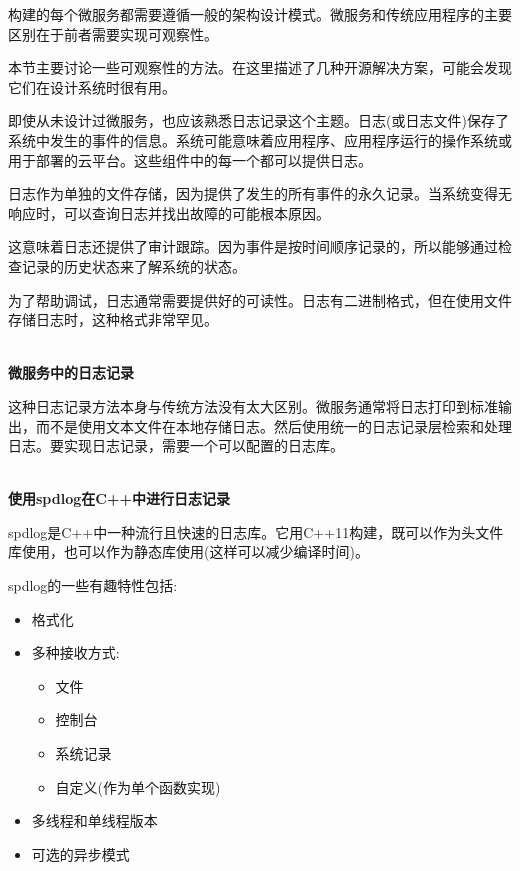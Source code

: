 
构建的每个微服务都需要遵循一般的架构设计模式。微服务和传统应用程序的主要区别在于前者需要实现可观察性。

本节主要讨论一些可观察性的方法。在这里描述了几种开源解决方案，可能会发现它们在设计系统时很有用。


即使从未设计过微服务，也应该熟悉日志记录这个主题。日志(或日志文件)保存了系统中发生的事件的信息。系统可能意味着应用程序、应用程序运行的操作系统或用于部署的云平台。这些组件中的每一个都可以提供日志。

日志作为单独的文件存储，因为提供了发生的所有事件的永久记录。当系统变得无响应时，可以查询日志并找出故障的可能根本原因。

这意味着日志还提供了审计跟踪。因为事件是按时间顺序记录的，所以能够通过检查记录的历史状态来了解系统的状态。

为了帮助调试，日志通常需要提供好的可读性。日志有二进制格式，但在使用文件存储日志时，这种格式非常罕见。

\hspace*{\fill} \\ %
\noindent
\textbf{微服务中的日志记录}

这种日志记录方法本身与传统方法没有太大区别。微服务通常将日志打印到标准输出，而不是使用文本文件在本地存储日志。然后使用统一的日志记录层检索和处理日志。要实现日志记录，需要一个可以配置的日志库。

\hspace*{\fill} \\ %
\noindent
\textbf{使用spdlog在C++中进行日志记录}

spdlog是C++中一种流行且快速的日志库。它用C++11构建，既可以作为头文件库使用，也可以作为静态库使用(这样可以减少编译时间)。

spdlog的一些有趣特性包括:

\begin{itemize}
\item 
格式化

\item 
多种接收方式:
\begin{itemize}
\item 
文件

\item 
控制台

\item 
系统记录

\item 
自定义(作为单个函数实现)
\end{itemize}

\item 
多线程和单线程版本

\item 
可选的异步模式
\end{itemize}

